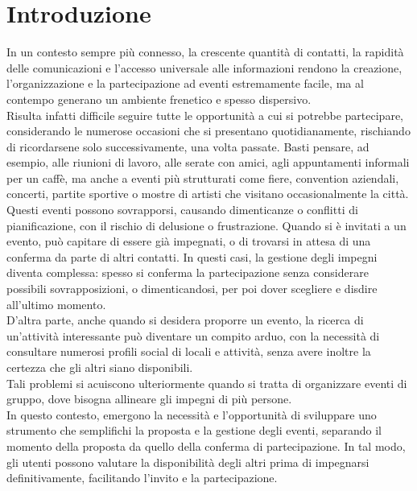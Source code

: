 

\section*{Introduzione}


In un contesto sempre più connesso, la crescente quantità di contatti, la rapidità delle comunicazioni e l'accesso universale alle informazioni rendono la creazione, l'organizzazione e la partecipazione ad eventi estremamente facile, ma al contempo generano un ambiente frenetico e spesso dispersivo.\\
Risulta infatti difficile seguire tutte le opportunità a cui si potrebbe partecipare, considerando le numerose occasioni che si presentano quotidianamente, rischiando di ricordarsene solo successivamente, una volta passate. Basti pensare, ad esempio, alle riunioni di lavoro, alle serate con amici, agli appuntamenti informali per un caffè, ma anche a eventi più strutturati come fiere, convention aziendali, concerti, partite sportive o mostre di artisti che visitano occasionalmente la città.\\
Questi eventi possono sovrapporsi, causando dimenticanze o conflitti di pianificazione, con il rischio di delusione o frustrazione. Quando si è invitati a un evento, può capitare di essere già impegnati, o di trovarsi in attesa di una conferma da parte di altri contatti. In questi casi, la gestione degli impegni diventa complessa: spesso si conferma la partecipazione senza considerare possibili sovrapposizioni, o dimenticandosi, per poi dover scegliere e disdire all'ultimo momento. \\
D’altra parte, anche quando si desidera proporre un evento, la ricerca di un'attività interessante può diventare un compito arduo, con la necessità di consultare numerosi profili social di locali e attività, senza avere inoltre la certezza che gli altri siano disponibili.\\
Tali problemi si acuiscono ulteriormente quando si tratta di organizzare eventi di gruppo, dove bisogna allineare gli impegni di più persone. \\
In questo contesto, emergono la necessità e l'opportunità di sviluppare uno strumento che semplifichi la proposta e la gestione degli eventi, separando il momento della proposta da quello della conferma di partecipazione. In tal modo, gli utenti possono valutare la disponibilità degli altri prima di impegnarsi definitivamente, facilitando l'invito e la partecipazione.\\ 
